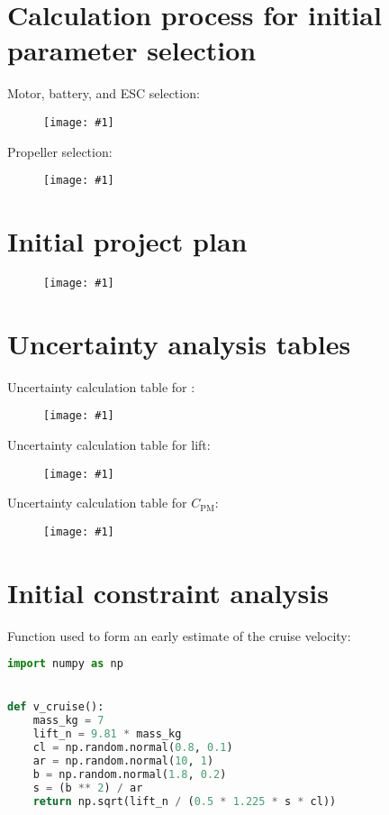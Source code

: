 \documentclass[../main.tex]{subfiles}
\newcommand{\appendiximage}[2]{
    \begin{figure}[H]
        \begin{center}
        \texttt{[image: \#1]}
        \end{center}
    \end{figure}
}
\begin{document}
\section{Calculation process for initial parameter selection} \label{appendix:calculation-process-for-initial-parameter-selection}

Motor, battery, and ESC selection:

\appendiximage{motor-battery-esc-selection-table}{0.95}

Propeller selection:

\appendiximage{propeller-selection-table}{0.95}

\section{Initial project plan} \label{appendix:initial-project-plan}

\appendiximage{initial-project-plan}{0.95}

\section{Uncertainty analysis tables} \label{appendix:uncertainty-analysis-tables}

Uncertainty calculation table for \cd:

\appendiximage{uncertainty-table-a}{0.95}

Uncertainty calculation table for lift:

\appendiximage{uncertainty-table-b}{0.95}

Uncertainty calculation table for $C_\mathrm{PM}$:

\appendiximage{uncertainty-table-c}{0.95}

\section{Initial constraint analysis} \label{appendix:initial-constraint-analysis}

Function used to form an early estimate of the cruise velocity:

\begin{lstlisting}[language=python,firstnumber=1]
import numpy as np


def v_cruise():
    mass_kg = 7
    lift_n = 9.81 * mass_kg
    cl = np.random.normal(0.8, 0.1)
    ar = np.random.normal(10, 1)
    b = np.random.normal(1.8, 0.2)
    s = (b ** 2) / ar
    return np.sqrt(lift_n / (0.5 * 1.225 * s * cl))
\end{lstlisting}
\end{document}

